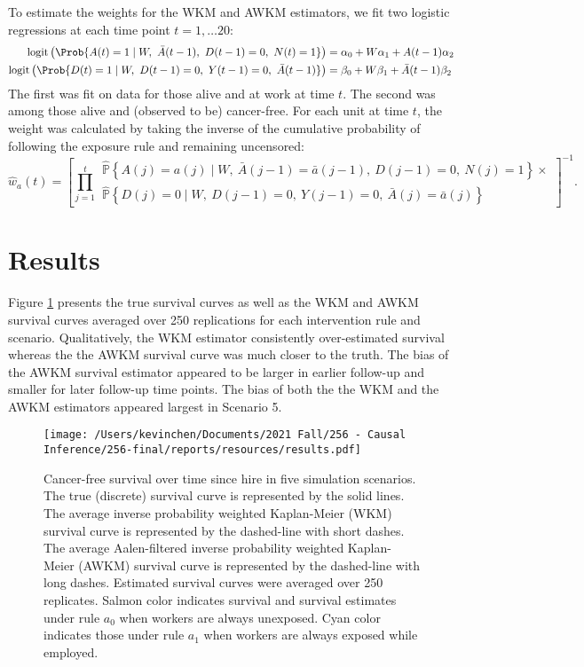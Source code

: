 \documentclass[
  11pt,
]{article}
\begin{document}
To estimate the weights for the WKM and AWKM estimators, we fit two
logistic regressions at each time point \(t = 1, \ldots 20\):
\[\begin{aligned}
\text{logit} \left(\Prob{
    A(t) = 1
    \mid W,\ \bar A(t - 1),\ D(t - 1) = 0,\ N(t) = 1
    }\right)
& = \alpha_0 + W \alpha_1 + A(t - 1) \alpha_2 \\
\text{logit} \left(\Prob{
    D(t) = 1
    \mid W,\ D(t - 1) = 0,\ Y(t - 1) = 0,\ \bar A(t - 1)}\right)
    & = \beta_0 + W \beta_1 + \bar A(t - 1) \beta_2
\end{aligned}\] The first was fit on data for those alive and at work at
time \(t\). The second was among those alive and (observed to be)
cancer-free. For each unit at time \(t\), the weight was calculated by
taking the inverse of the cumulative probability of following the
exposure rule and remaining uncensored: \[\hat w_{a} (t) =
    \left[
    \prod^t_{j = 1}
    \begin{aligned}
    \widehat {\mathbb P} \left\{
    A(j) = a(j) \mid W,\ \bar A(j - 1) = \bar a (j - 1),\ D(j - 1) = 0,\ N(j) = 1
    \right\} \times \\
    \widehat {\mathbb P} \left\{D(j) = 0
    \mid W,\ D(j - 1) = 0,\ Y(j - 1) = 0,\ \bar A(j) = \bar a (j) \right\}
    \end{aligned}\right]^{-1}.\]

\hypertarget{results}{%
\section{Results}\label{results}}

Figure \ref{fig:survival} presents the true survival curves as well as
the WKM and AWKM survival curves averaged over 250 replications for each
intervention rule and scenario. Qualitatively, the WKM estimator
consistently over-estimated survival whereas the the AWKM survival curve
was much closer to the truth. The bias of the AWKM survival estimator
appeared to be larger in earlier follow-up and smaller for later
follow-up time points. The bias of both the the WKM and the AWKM
estimators appeared largest in Scenario 5.

\begin{figure}
\caption{Cancer-free survival over time since hire in five simulation scenarios. The true (discrete) survival curve is represented by the solid lines. The average inverse probability weighted Kaplan-Meier (WKM) survival curve is represented by the dashed-line with short dashes. The average Aalen-filtered inverse probability weighted Kaplan-Meier (AWKM) survival curve is represented by the dashed-line with long dashes. Estimated survival curves were averaged over 250 replicates. Salmon color indicates survival and survival estimates under rule $a_0$ when workers are always unexposed. Cyan color indicates those under rule $a_1$ when workers are always exposed while employed.}
\label{fig:survival}
\begin{center}
\texttt{[image: /Users/kevinchen/Documents/2021 Fall/256 - Causal Inference/256-final/reports/resources/results.pdf]}
\end{center}
\end{figure}
\end{document}
